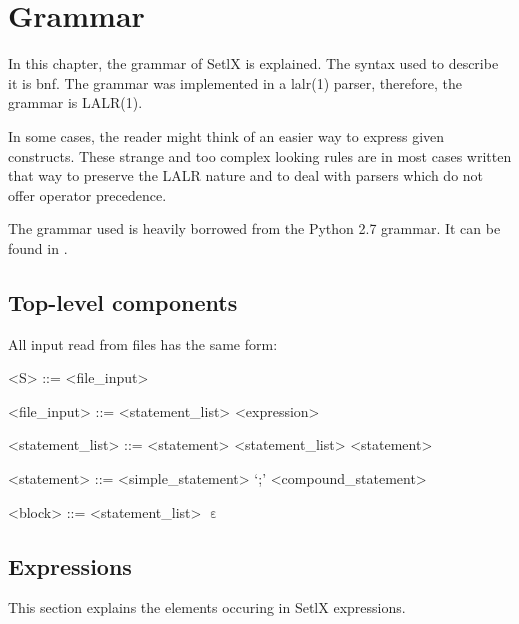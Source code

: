 \section{Grammar}

In this chapter, the grammar of SetlX is explained. The syntax used to describe it is \gls{bnf}. The grammar was implemented in a \gls{lalr}(1) parser, therefore, the grammar is LALR(1). 

In some cases, the reader might think of an easier way to express given constructs. These strange and too complex looking rules are in most cases written that way to preserve the LALR nature and to deal with parsers which do not offer operator precedence.

The grammar used is heavily borrowed from the Python 2.7 grammar. It can be found in \cite{py2}.

%
%
\subsection{Top-level components}

All input read from files has the same form:

\begin{grammar}
<S> ::= <file_input>

<file_input> ::= <statement_list>
\alt <expression>

<statement_list> ::= <statement>
\alt <statement_list> <statement>

<statement> ::= <simple_statement> `;'
\alt <compound_statement>

<block> ::= <statement_list>
\alt $\upepsilon$
\end{grammar}

%
%
\clearpage
\subsection{Expressions}

This section explains the elements occuring in SetlX expressions.

